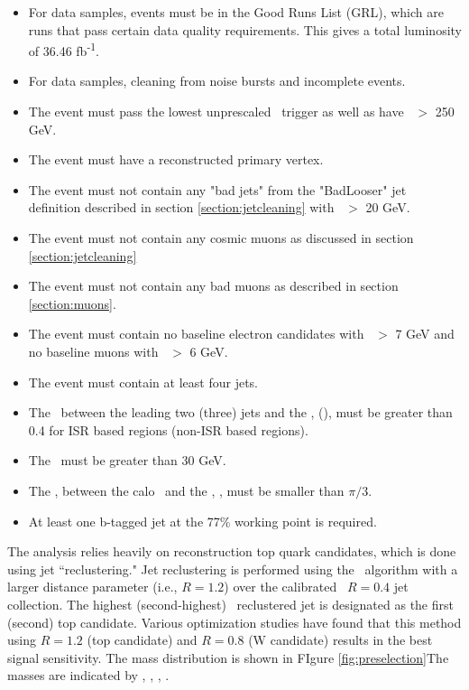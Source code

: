 \begin{itemize}
	\item For data samples, events must be in the Good Runs List (GRL), which are runs that pass certain data quality requirements.  This gives a total luminosity of 36.46 fb\textsuperscript{-1}.
	\item For data samples, cleaning from noise bursts and incomplete events.
	\item The event must pass the lowest unprescaled \met\ trigger as well as have \met\ $>$ 250 GeV.
	\item The event must have a reconstructed primary vertex.
	\item The event must not contain any "bad jets" from the "BadLooser" jet definition described in section \ref{section:jetcleaning} with \pt\ $>$ 20 GeV.
	\item The event must not contain any cosmic muons as discussed in section \ref{section:jetcleaning}
	\item The event must not contain any bad muons as described in section \ref{section:muons}.
	\item The event must contain no baseline electron candidates with \pt\ $>$ 7 GeV and no baseline muons with \pt\ $>$ 6 GeV.
	\item The event must contain at least four jets.
	\item The \dphi\ between the leading two (three) jets and the \met, \dphijettwomet (\dphijetthreemet), must be greater than 0.4 for ISR based regions (non-ISR based regions). 
	\item The \mettrk\ must be greater than 30 GeV.
	\item The \dphi, between the calo \met\ and the \mettrk, \dphimettrk, must be smaller than $\pi/3$.
\item At least one b-tagged jet at the 77\% working point is required.
\end{itemize}

The analysis relies heavily on reconstruction top quark candidates, which is done using jet ``reclustering."  Jet reclustering is performed using the \antikt\ algorithm with a larger distance parameter (i.e., $R=1.2$) over the calibrated \antikt\ $R=0.4$ jet collection. The highest (second-highest) \pT\ reclustered jet is designated as the first (second) top candidate. Various optimization studies have found that this method using $R=1.2$ (top candidate) and $R=0.8$ (W candidate) results in the best signal sensitivity. The mass distribution is shown in FIgure \ref{fig:preselection}The masses are indicated by \mantikttwelvezero, \mantikttwelveone, \mantikteightzero, \mantikteightone. \\



